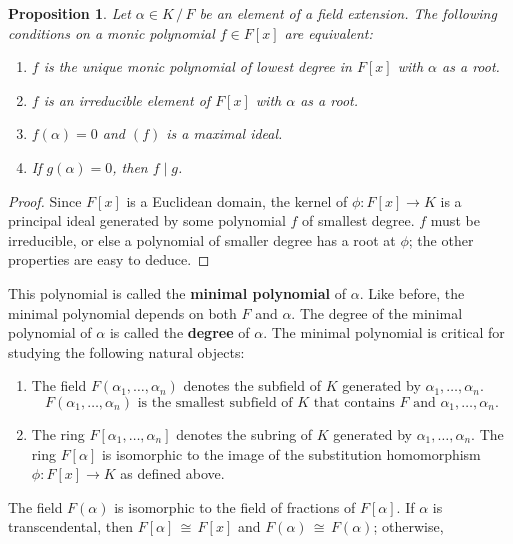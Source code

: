 \documentclass[11pt]{article}
\newtheorem{proposition}{Proposition}
\begin{document}
\begin{adjustwidth}{0.5cm}{}
  \begin{proposition}
    Let $\alpha \in K \, / \, F$ be an element of a field extension. The following conditions on a monic polynomial $f \in F[x]$ are equivalent:
    \begin{enumerate}
      \item $f$ is the unique monic polynomial of lowest degree in $F[x]$ with $\alpha$ as a root.
      \item $f$ is an irreducible element of $F[x]$ with $\alpha$ as a root.
      \item $f(\alpha) = 0$ and $(f)$ is a maximal ideal.
      \item If $g(\alpha) = 0$, then $f \mid g$.
    \end{enumerate}
  \end{proposition}
  \begin{proof}
    Since $F[x]$ is a Euclidean domain, the kernel of $\phi : F[x] \to K$ is a principal ideal generated by some polynomial $f$ of smallest degree. $f$ must be irreducible, or else a polynomial of smaller degree has a root at $\phi$; the other properties are easy to deduce.
  \end{proof}
\end{adjustwidth}
This polynomial is called the \textbf{minimal polynomial} of $\alpha$. Like before, the minimal polynomial depends on both $F$ and $\alpha$. The degree of the minimal polynomial of $\alpha$ is called the \textbf{degree} of $\alpha$. The minimal polynomial is critical for studying the following natural objects:
\begin{enumerate}
  \item The field $F(\alpha_{1}, \ldots, \alpha_{n})$ denotes the subfield of $K$ generated by $\alpha_{1}, \ldots, \alpha_{n}$.
  \[
    \text{$F(\alpha_{1}, \ldots, \alpha_{n})$ is the smallest subfield of $K$ that contains $F$ and $\alpha_{1}, \ldots, \alpha_{n}$}.
  \]
  \item The ring $F[\alpha_{1}, \ldots, \alpha_{n}]$ denotes the subring of $K$ generated by $\alpha_{1}, \ldots, \alpha_{n}$. The ring $F[\alpha]$ is isomorphic to the image of the substitution homomorphism $\phi : F[x] \to K$ as defined above.
\end{enumerate}
The field $F(\alpha)$ is isomorphic to the field of fractions of $F[\alpha]$. If $\alpha$ is transcendental, then $F[\alpha] \, \cong \, F[x]$ and $F(\alpha) \, \cong \, F(\alpha)$; otherwise,
\end{document}
